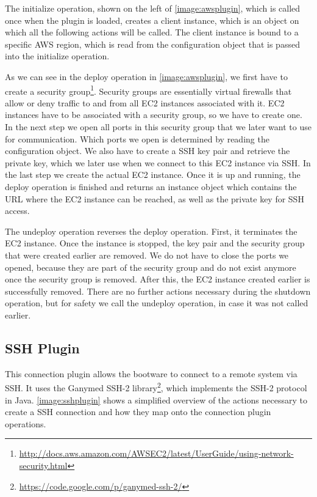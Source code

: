 The initialize operation, shown on the left of \autoref{image:awsplugin}, which is called once when the plugin is loaded, creates a client instance, which is an object on which all the following actions will be called.
The client instance is bound to a specific AWS region, which is read from the configuration object that is passed into the initialize operation.

As we can see in the deploy operation in \autoref{image:awsplugin}, we first have to create a security group\footnote{\url{http://docs.aws.amazon.com/AWSEC2/latest/UserGuide/using-network-security.html}}.
Security groups are essentially virtual firewalls that allow or deny traffic to and from all EC2 instances associated with it.
EC2 instances have to be associated with a security group, so we have to create one.
In the next step we open all ports in this security group that we later want to use for communication.
Which ports we open is determined by reading the configuration object.
We also have to create a SSH key pair and retrieve the private key, which we later use when we connect to this EC2 instance via SSH.
In the last step we create the actual EC2 instance.
Once it is up and running, the deploy operation is finished and returns an instance object which contains the URL where the EC2 instance can be reached, as well as the private key for SSH access.

The undeploy operation reverses the deploy operation.
First, it terminates the EC2 instance.
Once the instance is stopped, the key pair and the security group that were created earlier are removed.
We do not have to close the ports we opened, because they are part of the security group and do not exist anymore once the security group is removed.
After this, the EC2 instance created earlier is successfully removed.
There are no further actions necessary during the shutdown operation, but for safety we call the undeploy operation, in case it was not called earlier.

\subsection{SSH Plugin}

This connection plugin allows the bootware to connect to a remote system via SSH.
It uses the Ganymed SSH-2 library\footnote{\url{https://code.google.com/p/ganymed-ssh-2/}}, which implements the SSH-2 protocol in Java.
\autoref{image:sshplugin} shows a simplified overview of the actions necessary to create a SSH connection and how they map onto the connection plugin operations.


